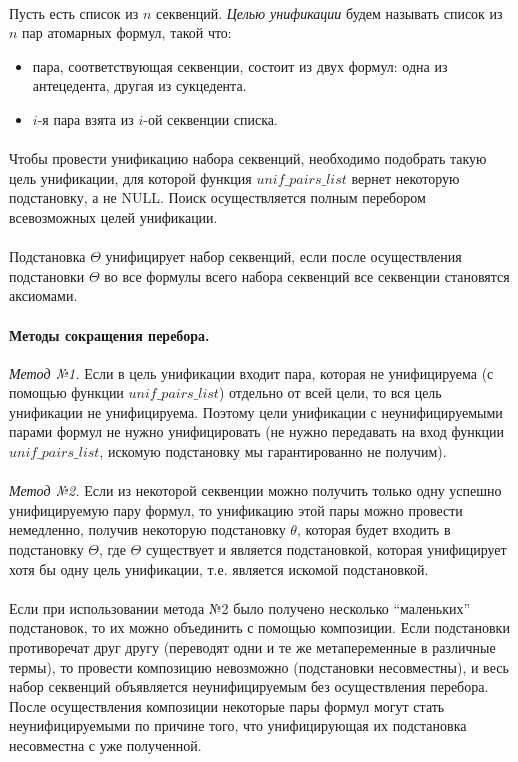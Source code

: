 \documentclass{cw1}
\begin{document}
\paragraph{}
Пусть есть список из $n$ секвенций. \textit{Целью унификации} будем называть список из $n$ пар атомарных
формул, такой что:
\begin{itemize}
 \item пара, соответствующая секвенции, состоит из двух формул: одна из антецедента, другая
 из сукцедента.
 \item $i$-я пара взята из $i$-ой секвенции списка.
\end{itemize}
\paragraph{}
Чтобы провести унификацию набора секвенций, необходимо подобрать такую цель
унификации, для которой функция $unif\!\!\_pairs\!\_list$ вернет некоторую подстановку, а не NULL. Поиск осуществляется
полным перебором всевозможных целей унификации.
\paragraph{}
Подстановка $\Theta$ унифицирует набор секвенций, если после осуществления подстановки $\Theta$ во все
формулы всего набора секвенций все секвенции становятся аксиомами.

\paragraph{Методы сокращения перебора.}
\textit{Метод №1.} Если в цель унификации входит пара, которая не унифицируема (с помощью функции
$unif\_pairs\_list$) отдельно от всей цели, то вся цель унификации не унифицируема. Поэтому цели
унификации с неунифицируемыми парами формул не нужно унифицировать (не нужно передавать
на вход функции $unif\_pairs\_list$, искомую подстановку мы гарантированно не получим).
\paragraph{}
\textit{Метод №2.}
Если из некоторой секвенции можно получить только одну успешно унифицируемую пару формул, то
унификацию этой пары можно провести немедленно, получив некоторую подстановку $\theta$, которая
будет входить в подстановку $\Theta$, где $\Theta$ существует и является подстановкой,
которая унифицирует хотя бы одну цель унификации, т.е. является искомой подстановкой.
\paragraph{}
Если при использовании метода №2 было получено несколько ``маленьких'' подстановок, то их можно
объединить с помощью композиции. Если подстановки противоречат друг другу (переводят одни
и те же метапеременные в различные термы), то провести композицию невозможно (подстановки
несовместны), и весь
набор секвенций объявляется неунифицируемым без осуществления перебора.
  После осуществления композиции некоторые пары формул могут стать неунифицируемыми по причине того,
что унифицирующая их подстановка несовместна с уже полученной. 
\end{document}
